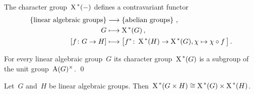 \begin{fluff}
  The character group~$\operatorname{X}^{\,*}(-)$ defines a contravariant functor
  \begin{align*}
    \left\{
      \text{linear algebraic groups}
    \right\}
    &\longrightarrow
    \left\{
      \text{abelian groups}
    \right\} \,,
    \\
                  G
    &\longmapsto  \operatorname{X}^{\,*}(G) \,,
    \\
                  [f \colon G \to H]
    &\longmapsto  \bigl[
                            f^*
                    \colon  \operatorname{X}^{\,*}(H)
                    \to     \operatorname{X}^{\,*}(G),
                            \chi
                    \mapsto \chi \circ f \,
                  \bigr] \,.
  \end{align*}
\end{fluff}


\begin{lemma}
  For every linear algebraic group~$G$ its character group~$\operatorname{X}^{\,*}(G)$ is a subgroup of the unit group~$\operatorname{A}(G)^\times$.
  \qed
\end{lemma}


\begin{lemma}
  \label{character group of product}
  Let~$G$ and~$H$ be linear algebraic groups.
  Then~$\operatorname{X}^{\,*}(G \times H) \cong \operatorname{X}^{\,*}(G) \times \operatorname{X}^{\,*}(H)$.
\end{lemma}


